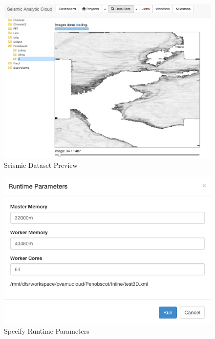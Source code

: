 \begin{figure}[H]
\centering
\includegraphics[scale=.45]{figures/DataSet.png}
\caption{Seismic Dataset Preview}
\label{DataSet}
\end{figure}

\begin{figure}[H]
\centering
\includegraphics[scale=.60]{figures/Runtime.png}
\caption{Specify Runtime Parameters}
\label{Runtime}
\end{figure}


